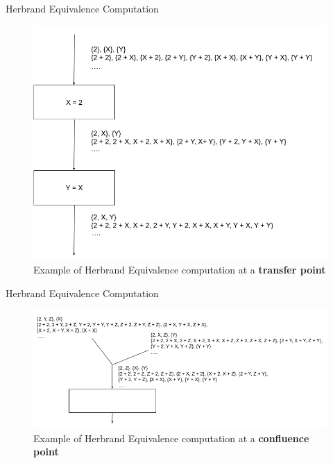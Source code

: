 \documentclass[11pt]{beamer}
\begin{document}
\begin{frame}{Herbrand Equivalence Computation}
    \begin{figure}[!h]
        \centering
        \includegraphics[scale=0.3]{HerbrandEquivalenceTrans.png}
        \caption{Example of Herbrand Equivalence computation at a \textbf{transfer point}}
        \label{fig:herbrandExample}
    \end{figure}
\end{frame}

\begin{frame}{Herbrand Equivalence Computation}
    \begin{figure}[!h]
        \centering
        \includegraphics[scale=0.35]{HerbrandEquivalenceConv.png}
        \caption{Example of Herbrand Equivalence computation at a \textbf{confluence point}}
        \label{fig:herbrandExample}
    \end{figure}
\end{frame}
\end{document}
